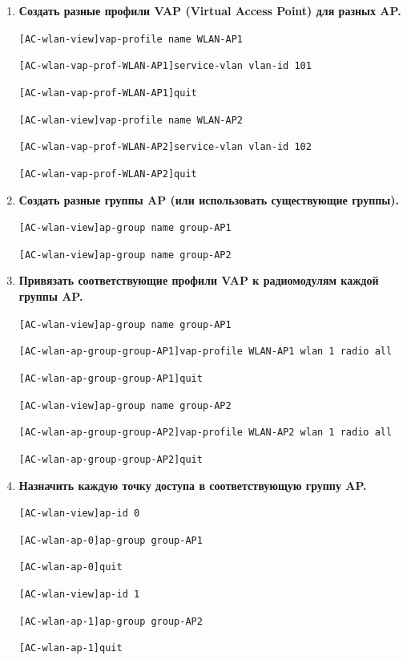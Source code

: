 \begin{enumerate}
\item \textbf{Создать разные профили VAP (Virtual Access Point) для разных AP.}
    
    \texttt{[AC-wlan-view]vap-profile name WLAN-AP1}

    \texttt{[AC-wlan-vap-prof-WLAN-AP1]service-vlan vlan-id 101}
    
    \texttt{[AC-wlan-vap-prof-WLAN-AP1]quit}
    
    \texttt{[AC-wlan-view]vap-profile name WLAN-AP2}

    \texttt{[AC-wlan-vap-prof-WLAN-AP2]service-vlan vlan-id 102}

    \texttt{[AC-wlan-vap-prof-WLAN-AP2]quit}

\item \textbf{Создать разные группы AP (или использовать существующие группы).}
    
    \texttt{[AC-wlan-view]ap-group name group-AP1}

    \texttt{[AC-wlan-view]ap-group name group-AP2}

\item \textbf{Привязать соответствующие профили VAP к радиомодулям каждой группы AP.}
    
    \texttt{[AC-wlan-view]ap-group name group-AP1}

    \texttt{[AC-wlan-ap-group-group-AP1]vap-profile WLAN-AP1 wlan 1 radio all}

    \texttt{[AC-wlan-ap-group-group-AP1]quit}
    
    \texttt{[AC-wlan-view]ap-group name group-AP2}

    \texttt{[AC-wlan-ap-group-group-AP2]vap-profile WLAN-AP2 wlan 1 radio all}

    \texttt{[AC-wlan-ap-group-group-AP2]quit}

\item \textbf{Назначить каждую точку доступа в соответствующую группу AP.}
    
    \texttt{[AC-wlan-view]ap-id 0}

    \texttt{[AC-wlan-ap-0]ap-group group-AP1}

    \texttt{[AC-wlan-ap-0]quit}
    
    \texttt{[AC-wlan-view]ap-id 1}

    \texttt{[AC-wlan-ap-1]ap-group group-AP2}

    \texttt{[AC-wlan-ap-1]quit}
\end{enumerate}
